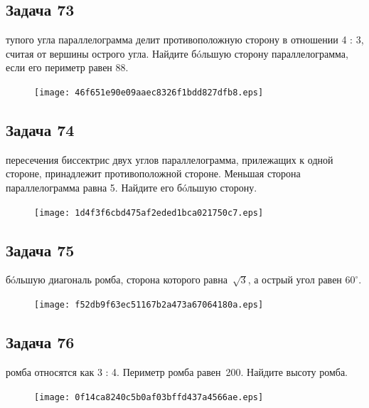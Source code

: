 \documentclass[a4paper,10pt]{article} %
\begin{document}
\begin{spacing}{1.0}
{\subsection*{Задача 73}
 тупого угла параллелограмма делит противоположную сторону в отношении 4 : 3, считая от вершины острого угла. Найдите б\'oльшую сторону параллелограмма, если его периметр равен 88.

\vspace{1.5cm}

\begin{figure}{\texttt{[image: 46f651e90e09aaec8326f1bdd827dfb8.eps]}}\end{figure}
\subsection*{Задача 74}
 пересечения биссектрис двух углов параллелограмма, прилежащих к одной стороне, принадлежит противоположной стороне. Меньшая сторона параллелограмма равна 5. Найдите его б\'oльшую сторону.

\vspace{1.5cm}

\begin{figure}{\texttt{[image: 1d4f3f6cbd475af2eded1bca021750c7.eps]}}\end{figure}
\subsection*{Задача 75}
 б\'oльшую диагональ ромба, сторона которого равна~$\sqrt{3}$, а острый угол равен $60^\circ$.

\vspace{1.5cm}

\begin{figure}{\texttt{[image: f52db9f63ec51167b2a473a67064180a.eps]}}\end{figure}
\subsection*{Задача 76}
 ромба относятся как 3 : 4. Периметр ромба равен~200. Найдите высоту ромба.

\vspace{1.5cm}

\begin{figure}{\texttt{[image: 0f14ca8240c5b0af03bffd437a4566ae.eps]}}\end{figure}
}
\end{spacing}
\end{document}
